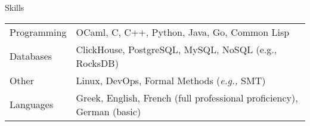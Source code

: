 \documentclass[11pt]{resume}
\begin{document}
\begin{rSection}{Skills}

  \begin{tabular}{ll}
    Programming & OCaml, C, C++, Python, Java, Go, Common Lisp \\

    Databases & ClickHouse, PostgreSQL, MySQL, NoSQL (e.g., RocksDB) \\

    Other & Linux, DevOps, Formal Methods (\emph{e.g.,} SMT) \\

    Languages & Greek, English, French (full professional
    proficiency), German (basic)
  \end{tabular}

\end{rSection}
\end{document}
